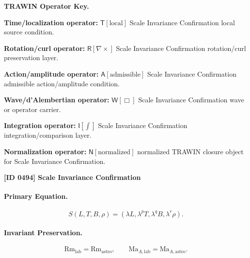 \par\vspace{0.45\baselineskip}
\noindent\begin{minipage}[t]{\linewidth}
\begingroup
\small
\raggedright
\textbf{TRAWIN Operator Key.}\par
\noindent\textbf{Time/localization operator:} $\mathsf{T}\!\left[\mathrm{local}\right]$ Scale Invariance Confirmation local source condition.\par
\noindent\textbf{Rotation/curl operator:} $\mathsf{R}\!\left[\nabla\times\right]$ Scale Invariance Confirmation rotation/curl preservation layer.\par
\noindent\textbf{Action/amplitude operator:} $\mathsf{A}\!\left[\mathrm{admissible}\right]$ Scale Invariance Confirmation admissible action/amplitude condition.\par
\noindent\textbf{Wave/d'Alembertian operator:} $\mathsf{W}\!\left[\Box\right]$ Scale Invariance Confirmation wave or operator carrier.\par
\noindent\textbf{Integration operator:} $\mathsf{I}\!\left[\int\right]$ Scale Invariance Confirmation integration/comparison layer.\par
\noindent\textbf{Normalization operator:} $\mathsf{N}\!\left[\mathrm{normalized}\right]$ normalized TRAWIN closure object for Scale Invariance Confirmation.\par
\endgroup
\end{minipage}

\clearpage
\noindent\textbf{[ID 0494] Scale Invariance Confirmation}\par
\vspace{0.35em}
\paragraph{Primary Equation.}
\begin{equation}
S(L,T,B,\rho)
=
(\lambda L,\lambda^{p}T,\lambda^{q}B,\lambda^{r}\rho).
\end{equation}

\paragraph{Invariant Preservation.}
\begin{equation}
\mathrm{Rm}_{\mathrm{lab}}=\mathrm{Rm}_{\mathrm{astro}},
\qquad
\mathrm{Ma}_{A,\mathrm{lab}}=\mathrm{Ma}_{A,\mathrm{astro}}.
\end{equation}

